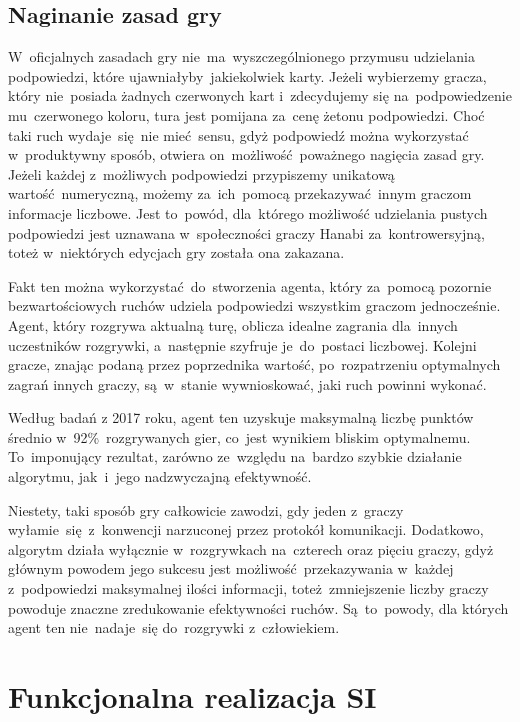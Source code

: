 \documentclass[declaration,shortabstract,inz]{iithesis}
\begin{document}
\section{Naginanie zasad gry}

W~oficjalnych zasadach gry nie~ma~wyszczególnionego przymusu udzielania podpowiedzi, które ujawniałyby jakiekolwiek karty. Jeżeli wybierzemy gracza, który nie~posiada żadnych czerwonych kart i~zdecydujemy się na~podpowiedzenie mu~czerwonego koloru, tura jest pomijana za~cenę żetonu podpowiedzi. Choć taki ruch wydaje~się~nie mieć sensu, gdyż podpowiedź można wykorzystać w~produktywny sposób, otwiera on~możliwość poważnego nagięcia zasad gry. Jeżeli każdej z~możliwych podpowiedzi przypiszemy unikatową wartość numeryczną, możemy za~ich~pomocą przekazywać innym graczom informacje liczbowe. Jest to~powód, dla~którego możliwość udzielania pustych podpowiedzi jest uznawana w~społeczności graczy Hanabi za~kontrowersyjną, toteż w~niektórych edycjach gry została ona zakazana.

Fakt ten można wykorzystać do~stworzenia agenta, który za~pomocą pozornie bezwartościowych ruchów udziela podpowiedzi wszystkim graczom jednocześnie. Agent, który rozgrywa aktualną turę, oblicza idealne zagrania dla~innych uczestników rozgrywki, a~następnie szyfruje je~do~postaci liczbowej. Kolejni gracze, znając podaną przez poprzednika wartość, po~rozpatrzeniu optymalnych zagrań innych graczy, są~w~stanie wywnioskować, jaki ruch powinni wykonać.

Według badań z 2017 roku\cite{HatPlayer}, agent ten uzyskuje maksymalną liczbę punktów średnio w~92\%~rozgrywanych gier, co~jest wynikiem bliskim optymalnemu. To~imponujący rezultat, zarówno ze~względu na~bardzo szybkie działanie algorytmu, jak~i~jego nadzwyczajną efektywność.

Niestety, taki sposób gry całkowicie zawodzi, gdy jeden z~graczy wyłamie~się z~konwencji narzuconej przez protokół komunikacji. Dodatkowo, algorytm działa wyłącznie w~rozgrywkach na~czterech oraz pięciu graczy, gdyż głównym powodem jego sukcesu jest możliwość przekazywania w~każdej z~podpowiedzi maksymalnej ilości informacji, toteż~zmniejszenie liczby graczy powoduje znaczne zredukowanie efektywności ruchów. Są~to~powody, dla których agent ten nie~nadaje~się do~rozgrywki z~człowiekiem.

\chapter{Funkcjonalna realizacja SI}
\end{document}
